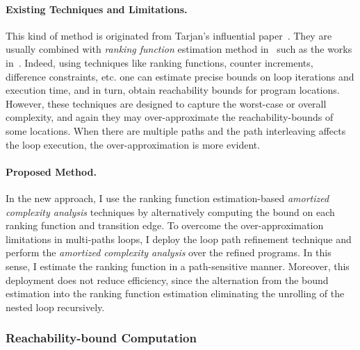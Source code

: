 \paragraph{Existing Techniques and Limitations.}
This kind of method is originated from Tarjan's influential paper~\cite{PotechinP17}.
They are usually combined with \emph{ranking function} estimation method in~\cite{BradleyMS05} such as the works in~\cite{ZulegerGSV11, SinnZV14, SinnZV17, LuCT21, AliasDFG10}.
Indeed, using techniques like ranking functions, counter increments, difference constraints, etc.
one can estimate 
precise bounds on loop iterations and execution time,
and in turn, obtain reachability bounds for program locations.
However, these techniques are designed to capture the worst-case or overall complexity, and again they may over-approximate the reachability-bounds of some locations.
When there are multiple paths and the path interleaving affects the loop execution, the over-approximation is more evident.

\paragraph{Proposed Method.}
In the new approach, I use the ranking function estimation-based \emph{amortized complexity analysis} techniques
by alternatively computing the bound on each ranking function and transition edge.
To overcome the over-approximation limitations in multi-paths loops, I deploy the loop path refinement technique and perform the \emph{amortized complexity analysis} over the refined programs.
In this sense, I estimate the ranking function in a path-sensitive manner.
Moreover, this deployment does not reduce efficiency, since 
the alternation from the bound estimation into the
ranking function estimation
eliminating the unrolling of the nested loop recursively.



\subsubsection{Reachability-bound Computation}
